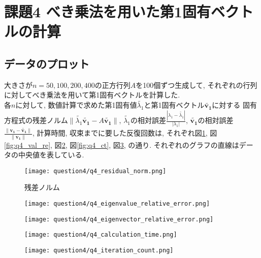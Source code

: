 \documentclass[uplatex,a4j]{jsarticle}
\begin{document}
\section{課題4 べき乗法を用いた第1固有ベクトルの計算}
\label{sec:q4}

\subsection{データのプロット}
\label{sec:q4_1}
大きさが$n = 50,100,200,400$の正方行列$A$を100個ずつ生成して, 
それぞれの行列に対してべき乗法を用いて第1固有ベクトルを計算した. \\
各$n$に対して, 数値計算で求めた第1固有値$\tilde{\lambda_1}$と第1固有ベクトル$\bm{\tilde{v_1}}$に対する
固有方程式の残差ノルム$\| \tilde{\lambda_1}\bm{\tilde{v_1}} - A \bm{\tilde{v_1}} \|$, 
$\tilde{\lambda_1}$の相対誤差$\frac{|\lambda_1 - \tilde{\lambda_1}|}{|\lambda_1|}$, 
$\bm{\tilde{v_1}}$の相対誤差$\frac{\| \bm{v_1} - \bm{\tilde{v_1}} \|}{\| \bm{v_1} \|}$, 
計算時間, 収束までに要した反復回数は, 
それぞれ図\ref{fig:q4_rn}, 図\ref{fig:q4_val_re}, 図\ref{fig:q4_vec_re}, 図\ref{fig:q4_ct}, 図\ref{fig:q4_ic}, の通り. 
それぞれのグラフの直線はデータの中央値を表している.

\begin{figure}[ht]
  \centering
  \texttt{[image: question4/q4\_residual\_norm.png]}
  \caption{残差ノルム}
  \label{fig:q4_rn}
\end{figure}

\begin{figure}[htbp]
  \centering

  \begin{minipage}[t]{0.48\textwidth}
    \centering
    \texttt{[image: question4/q4\_eigenvalue\_relative\_error.png]}
    \label{fig:q4_val_re}
  \end{minipage}
  \hfill
  \begin{minipage}[t]{0.48\textwidth}
    \centering
    \texttt{[image: question4/q4\_eigenvector\_relative\_error.png]}
    \label{fig:q4_vec_re}
  \end{minipage}
  
\end{figure}

\begin{figure}[htbp]
  \centering

  \begin{minipage}[t]{0.48\textwidth}
    \centering
    \texttt{[image: question4/q4\_calculation\_time.png]}
    \label{fig:q4_ct}
  \end{minipage}
  \hfill
  \begin{minipage}[t]{0.48\textwidth}
    \centering
    \texttt{[image: question4/q4\_iteration\_count.png]}
    \label{fig:q4_ic}
  \end{minipage}
  
\end{figure}
\end{document}
